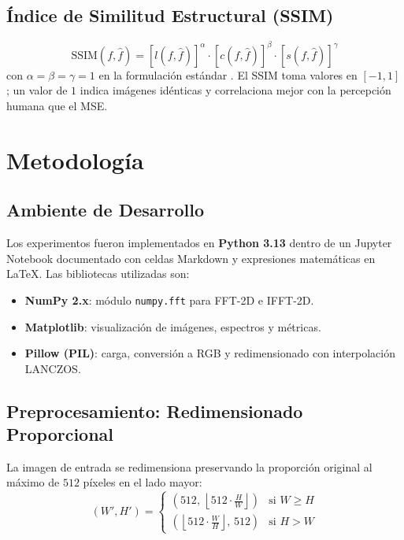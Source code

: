 \documentclass[conference]{IEEEtran}
\begin{document}
\subsection{Índice de Similitud Estructural (SSIM)}

\begin{equation}
  \mathrm{SSIM}(f,\hat{f}) = [l(f,\hat{f})]^\alpha \cdot [c(f,\hat{f})]^\beta
                              \cdot [s(f,\hat{f})]^\gamma
  \label{eq:ssim}
\end{equation}
con $\alpha=\beta=\gamma=1$ en la formulación estándar \cite{wang2004}.
El SSIM toma valores en $[-1,1]$; un valor de $1$ indica imágenes idénticas
y correlaciona mejor con la percepción humana que el MSE.

\section{Metodología}
\label{sec:metodologia}

\subsection{Ambiente de Desarrollo}

Los experimentos fueron implementados en \textbf{Python 3.13} dentro de
un Jupyter Notebook documentado con celdas Markdown y expresiones
matemáticas en \LaTeX. Las bibliotecas utilizadas son:

\begin{itemize}
  \item \textbf{NumPy 2.x}: módulo \texttt{numpy.fft} para FFT-2D e IFFT-2D.
  \item \textbf{Matplotlib}: visualización de imágenes, espectros y métricas.
  \item \textbf{Pillow (PIL)}: carga, conversión a RGB y redimensionado con
    interpolación LANCZOS.
\end{itemize}

\subsection{Preprocesamiento: Redimensionado Proporcional}

La imagen de entrada se redimensiona preservando la proporción original
al máximo de $512$ píxeles en el lado mayor:
\begin{equation}
  (W',H') = \begin{cases}
    \left(512,\, \left\lfloor 512\cdot\frac{H}{W}\right\rfloor\right) & \text{si } W\ge H \\[4pt]
    \left(\left\lfloor 512\cdot\frac{W}{H}\right\rfloor,\, 512\right) & \text{si } H>W
  \end{cases}
  \label{eq:resize}
\end{equation}
\end{document}
